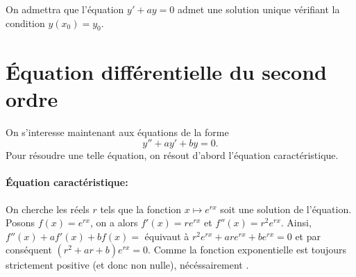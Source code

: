                   On admettra que l'\'equation $y' + a y = 0$ admet une
                  solution unique v\'erifiant la condition $y(x_0) = y_0$.
%
      \section{\'Equation diff\'erentielle du second ordre}
%
%
            On s'interesse maintenant aux \'equations de la forme 
            \begin{equation}
            \label{eq: diff second ordre}
                  y'' + a y' + by = 0.
            \end{equation}
            Pour r\'esoudre une telle \'equation, on r\'esout d'abord l'\'equation caract\'eristique.
            \paragraph{\'Equation caract\'eristique:}
	                  On cherche les r\'eels $r$ tels que la fonction $x \mapsto e^{rx}$ soit une solution de l'\'equation.
                  Posons $f(x) = e^{r x}$, on a alors $f'(x) = r e^{rx}$ et $f''(x) = r^2 e^{rx}$.
                  Ainsi, $f''(x) + a f'(x) + b f(x) = $ \'equivaut \`a 
                  $r^2 e^{rx} + a r e^{rx} + b e^{r x} = 0$ et par cons\'equent $(r^2 + a r + b) e^{r x} = 0$. 
	                  Comme la fonction exponentielle est toujours strictement positive (et donc non nulle), 
                  n\'ec\'essairement .
